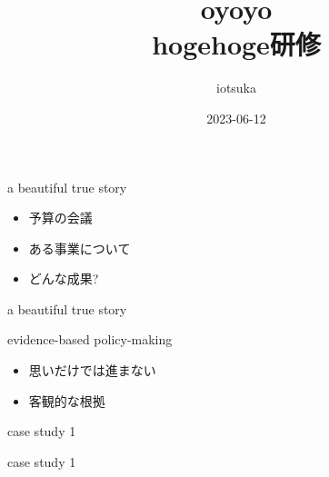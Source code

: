 \documentclass[
  ignorenonframetext,
]{beamer}
\title{oyoyo\\
hogehoge研修}
\author{iotsuka}
\date{2023-06-12}
\begin{document}
\frame{\titlepage}

\begin{frame}{a beautiful true story}
\protect\hypertarget{a-beautiful-true-story}{}
\Huge

\begin{itemize}
\item[\textbullet] 予算の会議\pause
\item[\textbullet] ある事業について\pause
\item[\textbullet] どんな成果?
\end{itemize}
\end{frame}

\begin{frame}{a beautiful true story}
\protect\hypertarget{a-beautiful-true-story-1}{}
\end{frame}

\begin{frame}{evidence-based policy-making}
\protect\hypertarget{evidence-based-policy-making}{}
\Huge

\begin{itemize}
\item[\textbullet] 思いだけでは進まない
\pause
\item[\textbullet] 客観的な根拠
\end{itemize}
\pause
\vspace*{-30pt}
\hspace*{18pt}
\end{frame}

\begin{frame}{case study 1}
\protect\hypertarget{case-study-1}{}
\end{frame}

\begin{frame}{case study 1}
\protect\hypertarget{case-study-1-1}{}
\Huge


\vspace*{-48pt}
\pause
{}
\end{frame}
\end{document}
